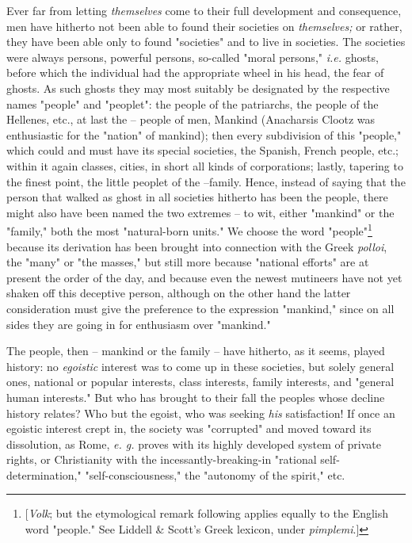 \documentclass[a4paper]{book}
\begin{document}
Ever far from letting \textit{themselves} come to their full development and 
consequence, men have hitherto not been able to found their societies on 
\textit{themselves;} or rather, they have been able only to found 
"{}societies"{} and to live in societies. The societies were always persons, 
powerful persons, so-called "{}moral persons,"{} \textit{i.e.} ghosts, before 
which the individual had the appropriate wheel in his head, the fear of 
ghosts. As such ghosts they may most suitably be designated by the respective 
names "{}people"{} and "{}peoplet"{}: the people of the patriarchs, the people 
of the Hellenes, etc., at last the -- people of men, Mankind (Anacharsis 
Clootz was enthusiastic for the "{}nation"{} of mankind); then every 
subdivision of this "{}people,"{} which could and must have its special 
societies, the Spanish, French people, etc.; within it again classes, cities, 
in short all kinds of corporations; lastly, tapering to the finest point, the 
little peoplet of the --family. Hence, instead of saying that the person that 
walked as ghost in all societies hitherto has been the people, there might 
also have been named the two extremes -- to wit, either "{}mankind"{} or the 
"{}family,"{} both the most "{}natural-born units."{} We choose the word 
"{}people"{}\footnote{[\textit{Volk}; but the etymological remark following 
applies equally to the English word "{}people."{} See Liddell \& Scott's Greek 
lexicon, under \textit{pimplemi}.]} because its derivation has been brought 
into connection with the Greek \textit{polloi}, the "{}many"{} or "{}the 
masses,"{} but still more because "{}national efforts"{} are at present the 
order of the day, and because even the newest mutineers have not yet shaken 
off this deceptive person, although on the other hand the latter consideration 
must give the preference to the expression "{}mankind,"{} since on all sides 
they are going in for enthusiasm over "{}mankind."{}

The people, then -- mankind or the family -- have hitherto, as it seems, 
played history: no \textit{egoistic} interest was to come up in these 
societies, but solely general ones, national or popular interests, class 
interests, family interests, and "{}general human interests."{} But who has 
brought to their fall the peoples whose decline history relates? Who but the 
egoist, who was seeking \textit{his} satisfaction! If once an egoistic 
interest crept in, the society was "{}corrupted"{} and moved toward its 
dissolution, as Rome, \textit{e. g.} proves with its highly developed system 
of private rights, or Christianity with the incessantly-breaking-in 
"{}rational self-determination,"{} "{}self-consciousness,"{} the "{}autonomy 
of the spirit,"{} etc.
\end{document}
